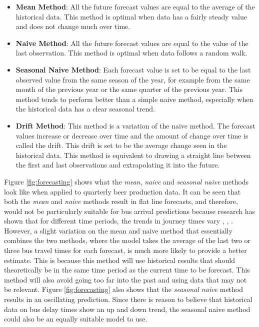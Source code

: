 \begin{itemize}
    \item \textbf{Mean Method}: All the future forecast values are equal to the average of the historical data. This method is optimal when data has a fairly steady value and does not change much over time.
    \item \textbf{Naive Method}: All the future forecast values are equal to the value of the last observation. This method is optimal when data follows a random walk.
    \item \textbf{Seasonal Naive Method}: Each forecast value is set to be equal to the last observed value from the same season of the year, for example from the same month of the previous year or the same quarter of the previous year. This method tends to perform better than a simple naive method, especially when the historical data has a clear seasonal trend. 
    \item \textbf{Drift Method}: This method is a variation of the naive method. The forecast values increase or decrease over time and the amount of change over time is called the drift. This drift is set to be the average change seen in the historical data. This method is equivalent to drawing a straight line between the first and last observations and extrapolating it into the future. 
\end{itemize}

Figure \ref{fig:forecasting} shows what the \textit{mean}, \textit{naive} and \textit{seasonal naive} methods look like when applied to quarterly beer production data. It can be seen that both the \textit{mean} and \textit{naive} methods result in flat line forecasts, and therefore, would not be particularly suitable for bus arrival predictions because research has shown that for different time periods, the trends in journey times vary \cite{dynamic-gps}, \cite{ann-prediction}, \cite{smart-public-transport}. However, a slight variation on the mean and naive method that essentially combines the two methods, where the model takes the average of the last two or three bus travel times for each forecast, is much more likely to provide a better estimate. This is because this method will use historical results that should theoretically be in the same time period as the current time to be forecast. This method will also avoid going too far into the past and using data that may not be relevant. Figure \ref{fig:forecasting} also shows that the \textit{seasonal naive} method results in an oscillating prediction. Since there is reason to believe that historical data on bus delay times show an up and down trend, the seasonal naive method could also be an equally suitable model to use.

